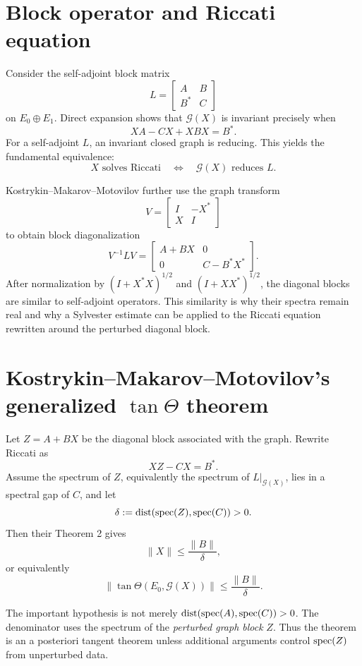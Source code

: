 \section{Block operator and Riccati equation}

Consider the self-adjoint block matrix
\[
  L=\begin{bmatrix}A&B\\B^*&C\end{bmatrix}
\]
on $E_0\oplus E_1$. Direct expansion shows that $\mathcal G(X)$ is invariant precisely when
\[
  XA-CX+XBX=B^*.
\]
For a self-adjoint $L$, an invariant closed graph is reducing. This yields the fundamental equivalence:
\[
  X\text{ solves Riccati}
  \quad\Longleftrightarrow\quad
  \mathcal G(X)\text{ reduces }L.
\]

Kostrykin--Makarov--Motovilov further use the graph transform
\[
  V=\begin{bmatrix}I&-X^*\\X&I\end{bmatrix}
\]
to obtain block diagonalization
\[
  V^{-1}LV=
  \begin{bmatrix}
    A+BX&0\\0&C-B^*X^*
  \end{bmatrix}.
\]
After normalization by $(I+X^*X)^{1/2}$ and $(I+XX^*)^{1/2}$, the diagonal blocks are similar to self-adjoint operators. This similarity is why their spectra remain real and why a Sylvester estimate can be applied to the Riccati equation rewritten around the perturbed diagonal block.

\section{Kostrykin--Makarov--Motovilov's generalized $\tan\Theta$ theorem}

Let $Z=A+BX$ be the diagonal block associated with the graph. Rewrite Riccati as
\[
  XZ-CX=B^*.
\]
Assume the spectrum of $Z$, equivalently the spectrum of $L|_{\mathcal G(X)}$, lies in a spectral gap of $C$, and let
\[
  \delta:=\operatorname{dist}(\operatorname{spec}(Z),\operatorname{spec}(C))>0.
\]
Then their Theorem 2 gives
\[
  \|X\|\le\frac{\|B\|}{\delta},
\]
or equivalently
\[
  \|\tan\Theta(E_0,\mathcal G(X))\|
  \le\frac{\|B\|}{\delta}.
\]

The important hypothesis is not merely $\operatorname{dist}(\operatorname{spec}(A),\operatorname{spec}(C))>0$. The denominator uses the spectrum of the \emph{perturbed graph block} $Z$. Thus the theorem is an a posteriori tangent theorem unless additional arguments control $\operatorname{spec}(Z)$ from unperturbed data.

